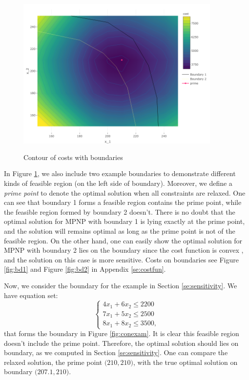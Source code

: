 \documentclass[a4paper,11pt]{article}
\begin{document}
\begin{figure}[ht]
\centering
\caption{Contour of costs with boundaries}
\hspace{0.7cm}
\includegraphics[width=0.9\textwidth]{Example-figure_files/figure-latex/contour.png}
\label{fig:con}
\end{figure}

In Figure \ref{fig:con}, we also include two example boundaries to demonstrate different kinds of feasible region (on the left side of boundary). Moreover, we define a \emph{prime point} to denote the optimal solution when all constraints are relaxed. One can see that boundary 1 forms a feasible region contains the prime point, while the feasible region formed by boundary 2 doesn't. There is no doubt that the optimal solution for MPNP with boundary 1 is lying exactly at the prime point, and the solution will remains optimal as long as the prime point is not  of the feasible region. On the other hand, one can easily show the optimal solution for MPNP with boundary 2 lies on the boundary since the cost function is convex \cite{DT06}, and the solution on this case is more sensitive. Costs on boundaries see Figure \ref{fig:bd1} and Figure \ref{fig:bd2} in Appendix \ref{se:costfun}.

Now, we consider the boundary for the example in Section \ref{se:sensitivity}. We have equation set:
\[
\begin{cases}
    4 x_1 + 6 x_2 \leq 2200\\
    7 x_1 + 5 x_2 \leq 2500\\
    8 x_1 + 8 x_2 \leq 3500,
\end{cases}
\]
that forms the boundary in Figure \ref{fig:conexam}. It is clear this feasible region doesn't include the prime point. Therefore, the optimal solution should lies on boundary, as we computed in Section \ref{se:sensitivity}. One can compare the relaxed solution, the prime point $\big( 210,210 \big)$, with the true optimal solution on boundary $\big( 207.1,210 \big)$.
\end{document}

